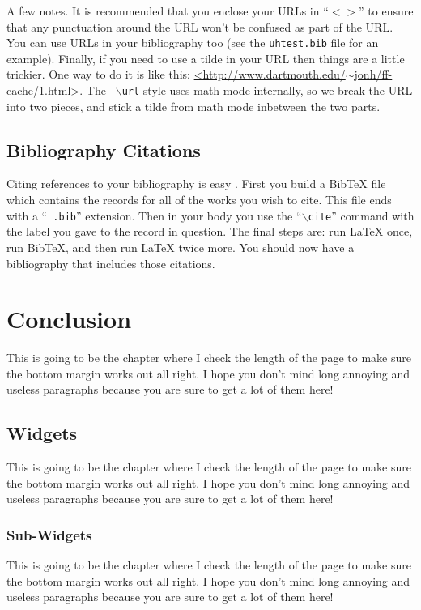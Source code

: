A few notes. It is recommended that you enclose your URLs in ``$<>$'' to ensure
that any punctuation around the URL won't be confused as part of the URL. You
can use URLs in your bibliography too (see the {\tt uhtest.bib} file for an
example). Finally, if you need to use a tilde in your URL then things are a
little trickier. One way to do it is like this:
\url{<http://www.dartmouth.edu/}$\sim$\url{jonh/ff-cache/1.html>}. The {\tt
$\backslash$url} style uses math mode internally, so we break the URL into two
pieces, and stick a tilde from math mode inbetween the two parts.

\section{Bibliography Citations}
Citing references to your bibliography is easy \cite{lamport:latex}
\cite{patashnik:bibtex}. First you build a BibTeX file which contains the
records for all of the works you wish to cite. This file ends with a ``{\tt
.bib}'' extension. Then in your body you use the ``{\tt $\backslash$cite}''
command with the label you gave to the record in question. The final steps are: 
run LaTeX once, run BibTeX, and then run LaTeX twice more. You should now have
a bibliography that includes those citations.

\chapter{Conclusion}

This is going to be the chapter where I check the length of the page to make
sure the bottom margin works out all right.  I hope you don't mind long
annoying and useless paragraphs because you are sure to get a lot of them here!

\section{Widgets}

This is going to be the chapter where I check the length of the page
to make sure the bottom margin works out all right.  I hope you don't
mind long annoying and useless paragraphs because you are sure to get
a lot of them here!

\subsection{Sub-Widgets}

This is going to be the chapter where I check the length of the page
to make sure the bottom margin works out all right.  I hope you don't
mind long annoying and useless paragraphs because you are sure to get
a lot of them here!

